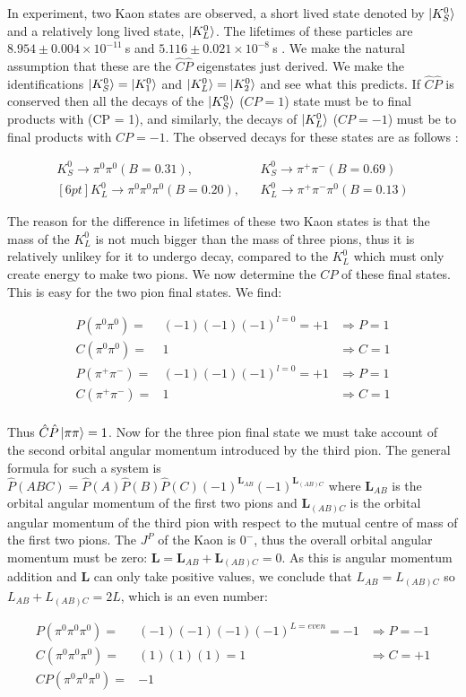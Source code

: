 In experiment, two Kaon states are observed, a short lived state denoted by $\ket{K^{0}_{S}}$ and a relatively long lived state, $\ket{K^{0}_{L}}$. The lifetimes of these particles are $8.954 \pm 0.004 \times 10^{−11}~$s and $5.116 \pm 0.021 \times 10^{−8}~$s \cite{PDGliveKaonLifetime}. We make the natural assumption that these are the $\hat{C}\hat{P}$ eigenstates just derived. We make the identifications $\ket{K^{0}_{S}} = \ket{K^{0}_{1}}$ and $\ket{K^{0}_{L}} = \ket{K^{0}_{2}}$ and see what this predicts. If $\hat{C}\hat{P}$ is conserved then all the decays of the $\ket{K^{0}_{S}}$ ($CP = 1$) state must be to final products with (CP = 1), and similarly, the decays of $\ket{K^{0}_{L}}$ ($CP = -1$) must be to final products with $CP = -1$. The observed decays for these states are as follows \cite[pg. 292]{Martin+Shaw}:

\begin{eqnarray*}    
K^{0}_S \rightarrow \pi^0 \pi^0 (B = 0.31),  &   &   K^{0}_{S} \rightarrow \pi^{+} \pi^{-} (B = 0.69)\\ [6pt]
K^{0}_L \rightarrow \pi^0 \pi^0 \pi^0 (B = 0.20),   &   &   K^{0}_{L} \rightarrow \pi^{+}  \pi^{-} \pi^0 (B =0.13)  
\end{eqnarray*}    

\noindent The reason for the difference in lifetimes of these two Kaon states is that the mass of the $K^{0}_L$ is not much bigger than the mass of three pions, thus it is relatively unlikey for it to undergo decay, compared to the $K^{0}_L$ which must only create energy to make two pions. We now determine the $CP$ of these final states. This is easy for the two pion final states. We find:

\begin{align*}
{P} ({\pi^0 \pi^0})   = & (-1)(-1)(-1)^{l=0} = +1 & \Rightarrow P = 1 \\
{C} ({\pi^0 \pi^0})   = & 1                       & \Rightarrow C = 1 \\
{P} ({\pi^+ \pi^-})   = & (-1)(-1)(-1)^{l=0} = +1 & \Rightarrow P = 1 \\
{C} ({\pi^+ \pi^-})   = & 1                       & \Rightarrow C = 1 \\
\end{align*}

\noindent Thus $\hat{C}\hat{P} \ket{\pi \pi} = 1$. Now for the three pion final state we must take account of the second orbital angular momentum introduced by the  third pion. The general formula for such a system is $\hat{P} (ABC) = \hat{P} (A) \hat{P} (B) \hat{P}(C) (-1)^{\mathbf{L}_{AB}} (-1)^{\mathbf{L}_{(AB)C}}$ where $\mathbf{L}_{AB}$ is the orbital angular momentum of the first two pions and $\mathbf{L}_{(AB)C}$ is the orbital angular momentum of the third pion with respect to the mutual centre of mass of the first two pions. The $J^{P}$ of the Kaon is $0^{-}$, thus the overall orbital angular momentum must be zero: $\mathbf{L} = \mathbf{L}_{AB} + \mathbf{L}_{(AB)C} = 0$. As this is angular momentum addition and $\mathbf{L}$ can only take positive values, we conclude that ${L}_{AB} = {L}_{(AB)C}$ so ${L}_{AB} + {L}_{(AB)C} = 2L$, which is an even number: 

\begin{align*}
P(\pi^0 \pi^0 \pi^0)  = & (-1)(-1)(-1)(-1)^{L = even} = -1 & \Rightarrow P = -1 \\
C(\pi^0 \pi^0 \pi^0)  = & (1)(1)(1) = 1                     & \Rightarrow C = +1 \\
CP(\pi^0 \pi^0 \pi^0) = & -1                                &
\end{align*}
